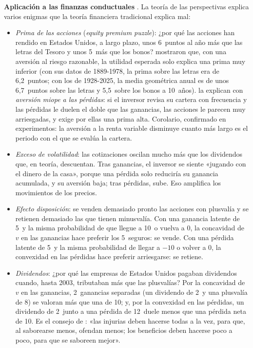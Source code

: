 \documentclass[11pt]{article}
\begin{document}
\begin{anotaciones}
\textbf{Aplicación a las finanzas conductuales}  . La teoría de las perspectivas explica varios enigmas que la teoría financiera tradicional explica mal:
\begin{itemize}
\item \emph{Prima de las acciones} (\emph{equity premium puzzle}): ¿por qué las acciones han rendido en Estados Unidos, a largo plazo, unos 6~puntos al año más que las letras del Tesoro y unos 5~más que los bonos? \textcite{MehraPrescott1985Equity} mostraron que, con una aversión al riesgo razonable, la utilidad esperada solo explica una prima muy inferior (con sus datos de 1889-1978, la prima sobre las letras era de 6,2~puntos; con los de 1928-2025, la media geométrica anual es de unos 6,7~puntos sobre las letras y 5,5~sobre los bonos a 10~años)\nocite{Damodaran2026Historical,UBS2026Yearbook}. \textcite{BenartziThaler1995Myopic} la explican con \emph{aversión miope a las pérdidas}: si el inversor revisa su cartera con frecuencia y las pérdidas le duelen el doble que las ganancias, las acciones le parecen muy arriesgadas, y exige por ellas una prima alta. Corolario, confirmado en experimentos: la aversión a la renta variable disminuye cuanto más largo es el periodo con el que se evalúa la cartera.
\item \emph{Exceso de volatilidad}: las cotizaciones oscilan mucho más que los dividendos que, en teoría, descuentan\nocite{Shiller1981Stock}. Tras ganancias, el inversor se siente «jugando con el dinero de la casa»\nocite{ThalerJohnson1990House}, porque una pérdida solo reduciría su ganancia acumulada, y su aversión baja; tras pérdidas, sube. Eso amplifica los movimientos de los precios\nocite{BarberisHuangSantos2001Prospect}.
\item \emph{Efecto disposición}: se venden demasiado pronto las acciones con plusvalía y se retienen demasiado las que tienen minusvalía\nocite{ShefrinStatman1985Disposition}. Con una ganancia latente de 5~y la misma probabilidad de que llegue a 10~o vuelva a 0, la concavidad de $v$ en las ganancias hace preferir los 5~seguros: se vende. Con una pérdida latente de 5~y la misma probabilidad de llegar a $-10$ o volver a 0, la convexidad en las pérdidas hace preferir arriesgarse: se retiene.
\item \emph{Dividendos}: ¿por qué las empresas de Estados Unidos pagaban dividendos cuando, hasta 2003, tributaban más que las plusvalías\nocite{Gravelle2003Dividends,IRS2026Topic404}? Por la concavidad de $v$ en las ganancias, 2~ganancias separadas (un dividendo de 2~y una plusvalía de 8) se valoran más que una de 10; y, por la convexidad en las pérdidas, un dividendo de 2~junto a una pérdida de 12~duele menos que una pérdida neta de 10\nocite{ShefrinStatman1984Dividends,Thaler1985Mental}. Es el consejo de : «las injurias deben hacerse todas a la vez, para que, al saborearse menos, ofendan menos; los beneficios deben hacerse poco a poco, para que se saboreen mejor»\nocite{Maquiavelo1532Principe}.
\end{itemize}
\end{anotaciones}
\end{document}
